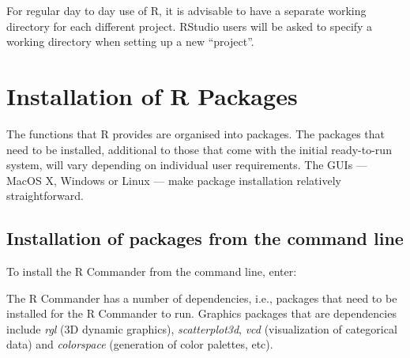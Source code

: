 For regular day to day use of R,
it is advisable to have a separate working
directory for each different project.
RStudio users will be asked to specify
a working directory when setting up a new ``project''.

\section{Installation of R Packages}\label{sec:pkgs}

\noindent
{}
\vspace*{6pt}

The functions that R provides are organised into packages.  The
packages that need to be installed, additional to those that come with
the initial ready-to-run system, will vary depending on individual
user requirements.  The GUIs --- MacOS X, Windows or Linux --- make
package installation relatively straightforward.

\subsection*{Installation of packages from the command line}

To install the R Commander from the command line, enter:
\begin{knitrout}
\color{fgcolor}\begin{kframe}
\begin{alltt}
\hlstd{(}\hlstd{,} \hlstd{=}\hlstd{)}
\end{alltt}
\end{kframe}
\end{knitrout}
The R Commander has a number of dependencies, i.e., packages that
need to be installed for the R Commander to run.  Graphics packages
that are dependencies include \textit{rgl} (3D dynamic graphics),
\textit{scatterplot3d}, \textit{vcd} (visualization of categorical
data) and \textit{colorspace} (generation of color palettes, etc).

